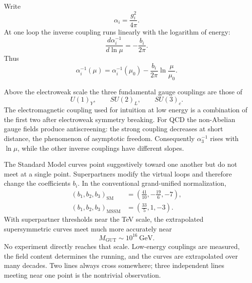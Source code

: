 Write
\begin{equation}
\alpha_i=\frac{g_i^2}{4\pi}.
\end{equation}
At one loop the inverse coupling runs linearly with the logarithm of energy:
\begin{equation}
\frac{d\alpha_i^{-1}}{d\ln\mu}
=-\frac{b_i}{2\pi}.
\end{equation}
Thus
\begin{equation}
\alpha_i^{-1}(\mu)
=\alpha_i^{-1}(\mu_0)
-\frac{b_i}{2\pi}\ln\frac{\mu}{\mu_0}.
\end{equation}

Above the electroweak scale the three fundamental gauge couplings are those of
\begin{equation}
U(1)_Y,\qquad SU(2)_L,\qquad SU(3)_c.
\end{equation}
The electromagnetic coupling used for intuition at low energy is a combination of the first two after electroweak symmetry breaking. For QCD the non-Abelian gauge fields produce antiscreening: the strong coupling decreases at short distance, the phenomenon of asymptotic freedom. Consequently \(\alpha_3^{-1}\) rises with \(\ln\mu\), while the other inverse couplings have different slopes.

The Standard Model curves point suggestively toward one another but do not meet at a single point. Superpartners modify the virtual loops and therefore change the coefficients \(b_i\). In the conventional grand-unified normalization,
\begin{align}
(b_1,b_2,b_3)_{\mathrm{SM}}
&=\left(\frac{41}{10},-\frac{19}{6},-7\right),\\
(b_1,b_2,b_3)_{\mathrm{MSSM}}
&=\left(\frac{33}{5},1,-3\right).
\end{align}
With superpartner thresholds near the TeV scale, the extrapolated supersymmetric curves meet much more accurately near
\begin{equation}
M_{\mathrm{GUT}}\sim 10^{16}\ \mathrm{GeV}.
\end{equation}
No experiment directly reaches that scale. Low-energy couplings are measured, the field content determines the running, and the curves are extrapolated over many decades. Two lines always cross somewhere; three independent lines meeting near one point is the nontrivial observation.

